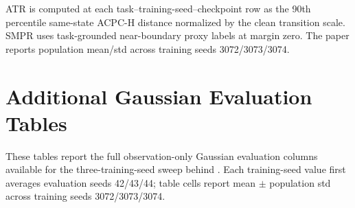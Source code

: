 \documentclass[10pt]{article}
\begin{document}
ATR is computed at each task--training-seed--checkpoint row as the 90th percentile same-state ACPC-H distance normalized by the clean transition scale. SMPR uses task-grounded near-boundary proxy labels at margin zero. The paper reports population mean/std across training seeds 3072/3073/3074.

\section{Additional Gaussian Evaluation Tables}\label{sec:appendix-gaussian-evals}

These tables report the full observation-only Gaussian evaluation columns available for the three-training-seed sweep behind . Each training-seed value first averages evaluation seeds 42/43/44; table cells report mean $\pm$ population std across training seeds 3072/3073/3074.
\end{document}
